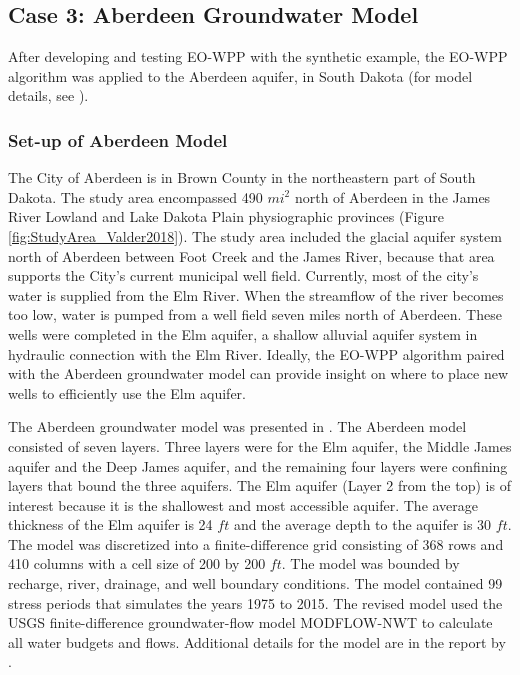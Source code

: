 \documentclass[authoryear]{elsarticle}
\begin{document}
\subsection{Case 3: Aberdeen Groundwater Model}
After developing and testing EO-WPP with the synthetic example, the EO-WPP algorithm was applied to the Aberdeen aquifer, in South Dakota (for model details, see \citet{valder2018revised}). %

\subsubsection{Set-up of Aberdeen Model}
The City of Aberdeen is in Brown County in the northeastern part of South Dakota. The study area encompassed 490 $mi^2$ north of Aberdeen in the James River Lowland and Lake Dakota Plain physiographic provinces (Figure \ref{fig:StudyArea_Valder2018}). The study area included the glacial aquifer system north of Aberdeen between Foot Creek and the James River, because that area supports the City’s current municipal well field. Currently, most of the city’s water is supplied from the Elm River. When the streamflow of the river becomes too low, water is pumped from a well field seven miles north of Aberdeen. These wells were completed in the Elm aquifer, a shallow alluvial aquifer system in hydraulic connection with the Elm River. Ideally, the EO-WPP algorithm paired with the Aberdeen groundwater model can provide insight on where to place new wells to efficiently use the Elm aquifer.

The Aberdeen groundwater model was  presented in \citep{valder2018revised}.  The Aberdeen model consisted of seven layers. Three layers were for the Elm aquifer, the Middle James aquifer and the Deep James aquifer, and the remaining four layers were confining layers that bound the three aquifers. The Elm aquifer (Layer 2 from the top) is of interest because it is the shallowest and most accessible aquifer. The average thickness of the Elm aquifer is 24 $ft$ and the average depth to the aquifer is 30 $ft$. The model was discretized into a finite-difference grid consisting of 368 rows and 410 columns with a cell size of 200 by 200 $ft$. The model was bounded by recharge, river, drainage, and well boundary conditions. The model contained 99 stress periods that simulates the years 1975 to 2015. The revised model used the USGS finite-difference groundwater-flow model MODFLOW-NWT to calculate all water budgets and flows. Additional details for the model are in the report by \cite{valder2018revised}.
\end{document}
